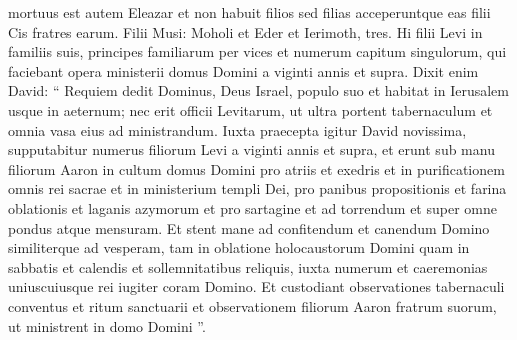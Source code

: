 \begin{biblechapter}
\begin{biblechapter}
\begin{biblechapter}
\begin{biblechapter}
\begin{biblechapter}
\begin{biblechapter}
\begin{biblechapter}
\begin{biblechapter}
\begin{biblechapter}
\begin{biblechapter}
\begin{biblechapter}
\begin{biblechapter}
\begin{biblechapter}
\begin{biblechapter}
\begin{biblechapter}
\begin{biblechapter}
\begin{biblechapter}
\begin{biblechapter}
\begin{biblechapter}
\begin{biblechapter}
\begin{biblechapter}
\begin{biblechapter}
\begin{biblechapter}
\verse mortuus est autem Eleazar et non habuit filios sed filias acceperuntque eas filii Cis fratres earum. 
\verse Filii Musi: Moholi et Eder et Ierimoth, tres.
 \verse Hi filii Levi in familiis suis, principes familiarum per vices et numerum capitum singulorum, qui faciebant opera ministerii domus Domini a viginti annis et supra.
 \verse Dixit enim David: “ Requiem dedit Dominus, Deus Israel, populo suo et habitat in Ierusalem usque in aeternum; 
\verse nec erit officii Levitarum, ut ultra portent tabernaculum et omnia vasa eius ad ministrandum. 
\verse Iuxta praecepta igitur David novissima, supputabitur numerus filiorum Levi a viginti annis et supra, 
\verse et erunt sub manu filiorum Aaron in cultum domus Domini pro atriis et exedris et in purificationem omnis rei sacrae et in ministerium templi Dei, 
 \verse pro panibus propositionis et farina oblationis et laganis azymorum et pro sartagine et ad torrendum et super omne pondus atque mensuram. 
\verse Et stent mane ad confitendum et canendum Domino similiterque ad vesperam, 
\verse tam in oblatione holocaustorum Domini quam in sabbatis et calendis et sollemnitatibus reliquis, iuxta numerum et caeremonias uniuscuiusque rei iugiter coram Domino. 
 \verse Et custodiant observationes tabernaculi conventus et ritum sanctuarii et observationem filiorum Aaron fratrum suorum, ut ministrent in domo Domini ”.
 

\end{biblechapter}
\end{biblechapter}
\end{biblechapter}
\end{biblechapter}
\end{biblechapter}
\end{biblechapter}
\end{biblechapter}
\end{biblechapter}
\end{biblechapter}
\end{biblechapter}
\end{biblechapter}
\end{biblechapter}
\end{biblechapter}
\end{biblechapter}
\end{biblechapter}
\end{biblechapter}
\end{biblechapter}
\end{biblechapter}
\end{biblechapter}
\end{biblechapter}
\end{biblechapter}
\end{biblechapter}
\end{biblechapter}
